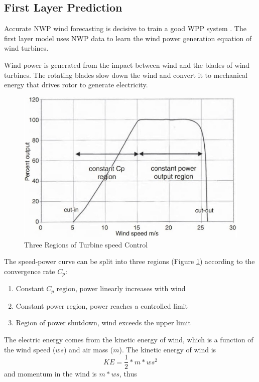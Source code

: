 \documentclass[conference]{IEEEtran}
\begin{document}
\subsection{First Layer Prediction}
Accurate NWP wind forecasting is decisive to train a good WPP system \cite{WANG20171345}. The first layer model uses NWP data to learn the wind power generation equation of wind turbines.

Wind power is generated from the impact between wind and the blades of wind turbines. The rotating blades slow down the wind and convert it to mechanical energy that drives rotor to generate electricity. %
\begin{figure}[htb]
\centering
\includegraphics[width=0.7\columnwidth]{FIG/turbine}
\caption{Three Regions of Turbine speed Control \cite{patel2005wind}}
\label{fig:turbine}
\vspace*{-5mm}
\end{figure}
The speed-power curve can be split into three regions (Figure \ref{fig:turbine}) according to the convergence rate $C_p$:
\begin{enumerate}
    \item Constant $C_p$ region, power linearly increases with wind
    \item Constant power region, power reaches a controlled limit
    \item Region of power shutdown, wind exceeds the upper limit
\end{enumerate}
The electric energy comes from the kinetic energy of wind, which is a function of the wind speed ($ws$) and air mass ($m$). The kinetic energy of wind is
\begin{equation}
    KE = \frac{1}{2}*m*ws^2
\end{equation}
and momentum in the wind is $m*ws$, thus
\end{document}
